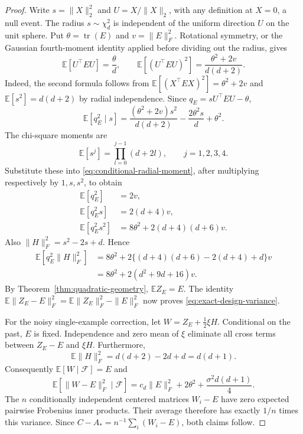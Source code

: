 \begin{proof}
Write $s=\|X\|_2^2$ and $U=X/\|X\|_2$, with any definition at
$X=0$, a null event. The radius $s\sim\chi_d^2$ is independent of the
uniform direction $U$ on the unit sphere. Put
$\theta=\operatorname{tr}(E)$ and $v=\|E\|_F^2$.
Rotational symmetry, or the Gaussian fourth-moment identity applied
before dividing out the radius, gives
\[
 \mathbb E[U^\top EU]=\frac{\theta}{d},\qquad
 \mathbb E[(U^\top EU)^2]=\frac{\theta^2+2v}{d(d+2)}.
\]
Indeed, the second formula follows from
$\mathbb E[(X^\top EX)^2]=\theta^2+2v$ and
$\mathbb E[s^2]=d(d+2)$ by radial independence.
Since $q_E=sU^\top EU-\theta$,
\begin{equation}
 \mathbb E[q_E^2\mid s]
 =\frac{(\theta^2+2v)s^2}{d(d+2)}
       -\frac{2\theta^2s}{d}+\theta^2.
 \label{eq:conditional-radial-moment}
\end{equation}
The chi-square moments are
\[
 \mathbb E[s^j]=\prod_{l=0}^{j-1}(d+2l),\qquad j=1,2,3,4.
\]
Substitute these into \eqref{eq:conditional-radial-moment}, after
multiplying respectively by $1,s,s^2$, to obtain
\begin{align*}
 \mathbb E[q_E^2]&=2v,\\
 \mathbb E[q_E^2s]&=2(d+4)v,\\
 \mathbb E[q_E^2s^2]&=8\theta^2+2(d+4)(d+6)v.
\end{align*}
Also $\|H\|_F^2=s^2-2s+d$. Hence
\begin{align*}
 \mathbb E[q_E^2\|H\|_F^2]
 &=8\theta^2+2\{(d+4)(d+6)-2(d+4)+d\}v\\
 &=8\theta^2+2(d^2+9d+16)v.
\end{align*}
By Theorem~\ref{thm:quadratic-geometry}, $\mathbb E Z_E=E$.
The identity
$\mathbb E\|Z_E-E\|_F^2=\mathbb E\|Z_E\|_F^2-\|E\|_F^2$
now proves \eqref{eq:exact-design-variance}.

For the noisy single-example correction, let
$W=Z_E+\tfrac12\xi H$. Conditional on the past, $E$ is fixed.
Independence and zero mean of $\xi$ eliminate all cross terms between
$Z_E-E$ and $\xi H$. Furthermore,
\[
 \mathbb E\|H\|_F^2=d(d+2)-2d+d=d(d+1).
\]
Consequently $\mathbb E[W\mid\mathcal F]=E$ and
\[
 \mathbb E[\|W-E\|_F^2\mid\mathcal F]
 =c_d\|E\|_F^2+2\theta^2+\frac{\sigma^2d(d+1)}4.
\]
The $n$ conditionally independent centered matrices $W_i-E$ have zero
expected pairwise Frobenius inner products. Their average therefore
has exactly $1/n$ times this variance. Since
$C-A_*=n^{-1}\sum_i(W_i-E)$, both claims follow.
\end{proof}

